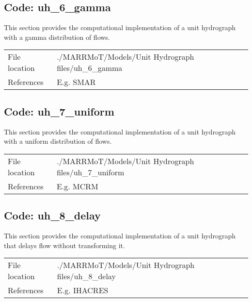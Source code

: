 \bigskip


\subsection{Code: uh\_6\_gamma} \label{sec:sm3_6}
This section provides the computational implementation of a unit hydrograph with a gamma distribution of flows. \\

\begin{tabular}{ll}
	File location & 	./MARRMoT/Models/Unit Hydrograph files/uh\_6\_gamma \\
	References & 	E.g. SMAR \citep{OConnell1970,Tan1996} \\
\end{tabular}

\bigskip


\subsection{Code: uh\_7\_uniform} \label{sec:sm3_7}
This section provides the computational implementation of a unit hydrograph with a uniform distribution of flows. \\

\begin{tabular}{ll}
	File location & 	./MARRMoT/Models/Unit Hydrograph files/uh\_7\_uniform \\
	References & 	E.g. MCRM \citep{Moore2001a,Moore2001} \\
\end{tabular}

\bigskip


\subsection{Code: uh\_8\_delay} \label{sec:sm3_8}
This section provides the computational implementation of a unit hydrograph that delays flow without transforming it. \\

\begin{tabular}{ll}
	File location & 	./MARRMoT/Models/Unit Hydrograph files/uh\_8\_delay \\
	References & 	E.g. IHACRES \citep{Littlewood1997,Croke2004} \\
\end{tabular}

\bigskip


